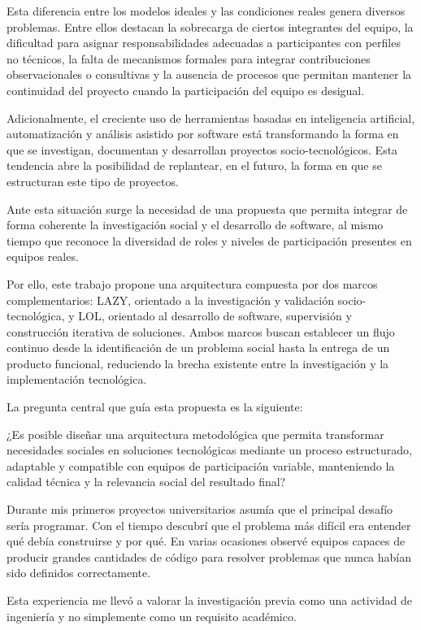 \documentclass[14pt,a4paper,oneside]{extbook}
\begin{document}
Esta diferencia entre los modelos ideales y las condiciones reales genera diversos problemas. Entre ellos destacan la sobrecarga de ciertos integrantes del equipo, la dificultad para asignar responsabilidades adecuadas a participantes con perfiles no técnicos, la falta de mecanismos formales para integrar contribuciones observacionales o consultivas y la ausencia de procesos que permitan mantener la continuidad del proyecto cuando la participación del equipo es desigual.

Adicionalmente, el creciente uso de herramientas basadas en inteligencia artificial, automatización y análisis asistido por software está transformando la forma en que se investigan, documentan y desarrollan proyectos socio-tecnológicos. Esta tendencia abre la posibilidad de replantear, en el futuro, la forma en que se estructuran este tipo de proyectos.

Ante esta situación surge la necesidad de una propuesta que permita integrar de forma coherente la investigación social y el desarrollo de software, al mismo tiempo que reconoce la diversidad de roles y niveles de participación presentes en equipos reales.

Por ello, este trabajo propone una arquitectura compuesta por dos marcos complementarios: LAZY, orientado a la investigación y validación socio-tecnológica, y LOL, orientado al desarrollo de software, supervisión y construcción iterativa de soluciones. Ambos marcos buscan establecer un flujo continuo desde la identificación de un problema social hasta la entrega de un producto funcional, reduciendo la brecha existente entre la investigación y la implementación tecnológica.

La pregunta central que guía esta propuesta es la siguiente:

\begin{keyquestion}
¿Es posible diseñar una arquitectura metodológica que permita transformar necesidades sociales en soluciones tecnológicas mediante un proceso estructurado, adaptable y compatible con equipos de participación variable, manteniendo la calidad técnica y la relevancia social del resultado final?
\end{keyquestion}

\begin{authorobservation}
Durante mis primeros proyectos universitarios asumía que el principal desafío sería programar. Con el tiempo descubrí que el problema más difícil era entender qué debía construirse y por qué. En varias ocasiones observé equipos capaces de producir grandes cantidades de código para resolver problemas que nunca habían sido definidos correctamente.

Esta experiencia me llevó a valorar la investigación previa como una actividad de ingeniería y no simplemente como un requisito académico.
\end{authorobservation}
\end{document}
